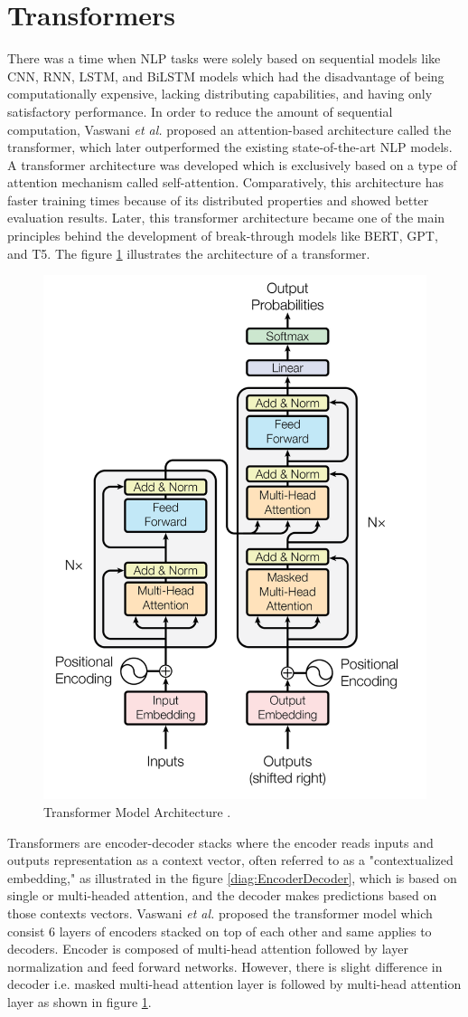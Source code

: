 \documentclass[%
	BCOR=8mm, %
	DIV=12,
	toc=bibliography, %
	toc=listof, %
	oneside, %
	egregdoesnotlikesansseriftitles, %
	]{scrbook}
\begin{document}
\section{Transformers}
\label{section: transformers}
There was a time when NLP tasks were solely based on sequential models like CNN, RNN, LSTM, and BiLSTM models which had the disadvantage of being computationally expensive, lacking distributing capabilities, and having only satisfactory performance. In order to reduce the amount of sequential computation,  Vaswani \textit{et al.} \cite{vaswani_attention_2017} proposed an attention-based architecture called the transformer, which later outperformed the existing state-of-the-art NLP models. A transformer architecture was developed which is exclusively based on a type of attention mechanism called self-attention. Comparatively, this architecture has faster training times because of its distributed properties and showed better evaluation results. 
Later, this transformer architecture became one of the main principles behind the development of break-through models like BERT, GPT, and T5. The figure \ref{diag:TransformerArchitecture} illustrates the architecture of a transformer.

\begin{figure}[h!]
    \centering
    \includegraphics[width=.50\textwidth]{img/TransformerArchitecture.png}
    \caption[Architecture diagram of Transformer]{Transformer Model Architecture \cite{vaswani_attention_2017}.}
    \label{diag:TransformerArchitecture}
\end{figure}
Transformers are encoder-decoder stacks where the encoder reads inputs and outputs representation as a context vector, often referred to as a "contextualized embedding," as illustrated in the figure \ref{diag:EncoderDecoder}, which is based on single or multi-headed attention, and the decoder makes predictions based on those contexts vectors. Vaswani \textit{et al.} \cite{vaswani_attention_2017} proposed the  transformer model which consist 6 layers of encoders stacked on top of each other and same applies to decoders. Encoder is composed of multi-head attention followed by layer normalization and feed forward networks. However, there is slight difference in decoder i.e. masked multi-head attention layer is followed by multi-head attention layer as shown in figure  \ref{diag:TransformerArchitecture}.
\end{document}
